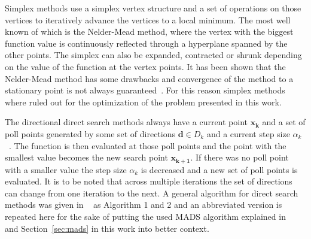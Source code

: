 \documentclass[a4paper,10pt]{article}
\renewcommand{\vec}[1]{\mathbf{#1}}
\newcommand{\secref}[1]{Section~\ref{#1}}
\begin{document}
    Simplex methods use a simplex vertex structure and a set
    of operations on those vertices to iteratively advance the vertices
    to a local minimum.
    The most well known of which is the Nelder-Mead method, where
    the vertex with the biggest function value is continuously
    reflected through a hyperplane spanned by the other points.
    The simplex can also be expanded, contracted or shrunk depending
    on the value of the function at the vertex points.
    It has been shown that the Nelder-Mead method has some drawbacks
    and convergence of the method to a stationary point is not always
    guaranteed~\cite{derivative_free_methods}.
    For this reason simplex methods where ruled out for the optimization
    of the problem presented in this work.
    
    The directional direct search methods always have a current point
    $\vec{x_k}$ and a set of poll points generated by some set
    of directions $\vec{d} \in D_k$ and a current step size $\alpha_k$
    ~\cite{derivative_free_methods}.
    The function is then evaluated at those poll points and the 
    point with the smallest value becomes the new search point 
    $\vec{x_{k+1}}$.
    If there was no poll point with a smaller value the step
    size $\alpha_k$ is decreased and a new set of poll points is
    evaluated.
    It is to be noted that across multiple iterations the set of
    directions can change from one iteration to the next.
    A general algorithm for direct search methods was given in
    ~\cite{derivative_free_methods} as Algorithm 1 and 2 and 
    an abbreviated version is 
    repeated here for the sake of putting the used MADS
    algorithm explained in ~\cite{mads_original} and 
    \secref{sec:mads} in this work into better context. 
\end{document}
